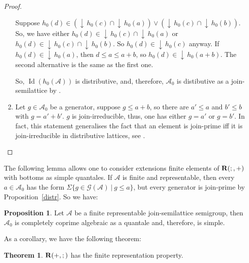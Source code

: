 \documentclass[a4paper]{article}
\theoremstyle{definition}
\theoremstyle{theorem}
\newtheorem{theorem}{Theorem}
\theoremstyle{proposition}
\newtheorem{proposition}{Proposition}
\theoremstyle{lemma}
\theoremstyle{ex}
\theoremstyle{corollary}
\theoremstyle{claim}
\newcommand{\down}[1]{\ensuremath{{\downarrow}\,#1}}
\begin{document}
\begin{proof}
\begin{enumerate}
    Suppose $h_0(d) \in (\down{h_0(c)} \cap \down{h_0(a)}) \vee (\down{h_0(c)} \cap \down{h_0(b)})$. So, we have either $h_0(d) \in \down{h_0(c)} \cap \down{h_0(a)}$ or $h_0(d) \in \down{h_0(c)} \cap \down{h_0(b)}$. So $h_0(d) \in \down{h_0(c)}$ anyway. If $h_0(d) \in \down{h_0(a)}$, then $d \leq a \leq a + b$, so $h_0(d) \in \down{h_0(a + b)}$.
    The second alternative is the same as the first one.

    So, $\operatorname{Id}(h_0(\mathcal{A}))$ is distributive, and, therefore, $\mathcal{A}_0$ is distibutive as a join-semilattice by \cite[Lemma 184]{gratzer2011lattice}.

    \item Let $g \in \mathcal{A}_0$ be a generator, suppose $g \leq a + b$, so there are $a' \leq a$ and $b' \leq b$ with $g = a' + b'$. $g$ is join-irreducible, thus, one has either $g = a'$ or $g = b'$. In fact, this statement generalises the fact that an element is join-prime iff it is join-irreducible in distributive lattices, see \cite[Lemma 5.11]{davey2002introduction}.
  \end{enumerate}
\end{proof}

The following lemma allows one to consider extensions finite elements of ${\bf R}(;,+)$ with bottoms as simple quantales. If $\mathcal{A}$ is finite and representable, then every $a \in \mathcal{A}_0$ has the form $\Sigma \{ g \in \mathcal{G}(\mathcal{A}) \: | \: g \leq a \}$, but every generator is join-prime by Proposition~\ref{distr}. So we have:

\begin{proposition}\label{quantalerepisok}
  Let $\mathcal{A}$ be a finite representable join-semilattice semigroup, then $\mathcal{A}_0$ is completely coprime algebraic as a quantale and, therefore, is simple.
\end{proposition}

As a corollary, we have the following theorem:

\begin{theorem}
  ${\bf R}(+, ;)$ has the finite representation property.
\end{theorem}
\end{document}
